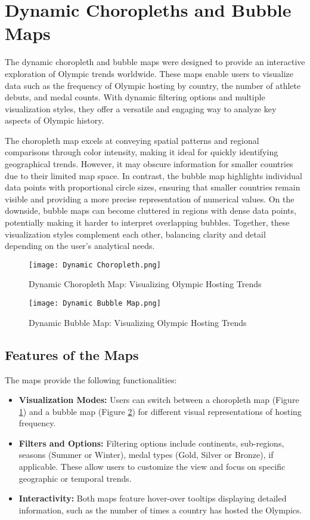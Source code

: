 \section{Dynamic Choropleths and Bubble Maps}

The dynamic choropleth and bubble maps were designed to provide an interactive exploration of Olympic trends worldwide. These maps enable users to visualize data such as the frequency of Olympic hosting by country, the number of athlete debuts, and medal counts. With dynamic filtering options and multiple visualization styles, they offer a versatile and engaging way to analyze key aspects of Olympic history.

The choropleth map excels at conveying spatial patterns and regional comparisons through color intensity, making it ideal for quickly identifying geographical trends. However, it may obscure information for smaller countries due to their limited map space. In contrast, the bubble map highlights individual data points with proportional circle sizes, ensuring that smaller countries remain visible and providing a more precise representation of numerical values. On the downside, bubble maps can become cluttered in regions with dense data points, potentially making it harder to interpret overlapping bubbles. Together, these visualization styles complement each other, balancing clarity and detail depending on the user's analytical needs.

\begin{figure}[ht]
    \centering
    \texttt{[image: Dynamic Choropleth.png]}
    \caption{Dynamic Choropleth Map: Visualizing Olympic Hosting Trends}
    \label{fig:choropleth_map}
\end{figure}

\begin{figure}[ht]
    \centering
    \texttt{[image: Dynamic Bubble Map.png]}
    \caption{Dynamic Bubble Map: Visualizing Olympic Hosting Trends}
    \label{fig:bubble_map}
\end{figure}

\subsection{Features of the Maps}

The maps provide the following functionalities:
\begin{itemize}
    \item \textbf{Visualization Modes:} Users can switch between a choropleth map (Figure \ref{fig:choropleth_map}) and a bubble map (Figure \ref{fig:bubble_map}) for different visual representations of hosting frequency.
    \item \textbf{Filters and Options:} Filtering options include continents, sub-regions, seasons (Summer or Winter), medal types (Gold, Silver or Bronze), if applicable. These allow users to customize the view and focus on specific geographic or temporal trends.
    \item \textbf{Interactivity:} Both maps feature hover-over tooltips displaying detailed information, such as the number of times a country has hosted the Olympics.
\end{itemize}

